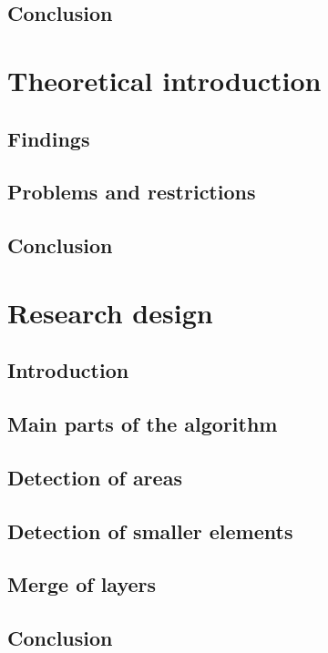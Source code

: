 \documentclass[a4paper,onecolumn,oneside,12pt]{memoir}
\begin{document}
\section{Conclusion}


\chapter{Theoretical introduction}

\section{Findings}

\section{Problems and restrictions}

\section{Conclusion}


\chapter{Research design}

\section{Introduction}

\section{Main parts of the algorithm}

\section{Detection of areas}

\section{Detection of smaller elements}

\section{Merge of layers}

\section{Conclusion}
\end{document}
